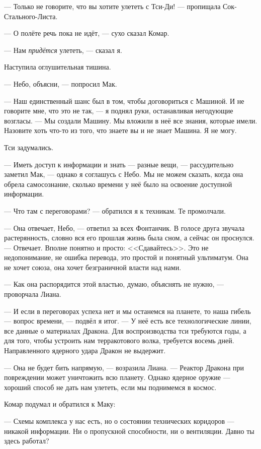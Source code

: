 --- Только не говорите, что вы хотите улететь с Тси-Ди! --- пропищала Сок-Стального-Листа.

--- О полёте речь пока не идёт, --- сухо сказал Комар.

--- Нам \emph{придётся} улететь, --- сказал я.

Наступила оглушительная тишина.

--- Небо, объясни, --- попросил Мак.

--- Наш единственный шанс был в том, чтобы договориться с Машиной.
И не говорите мне, что это не так, --- я поднял руки, останавливая негодующие возгласы.
--- Мы создали Машину.
Мы вложили в неё все знания, которые имели.
Назовите хоть что-то из того, что знаете вы и не знает Машина.
Я не могу.

Тси задумались.

--- Иметь доступ к информации и знать --- разные вещи, --- рассудительно заметил Мак, --- однако я соглашусь с Небо.
Мы не можем сказать, когда она обрела самосознание, сколько времени у неё было на освоение доступной информации.

--- Что там с переговорами? --- обратился я к техникам.
Те промолчали.

--- Она отвечает, Небо, --- ответил за всех Фонтанчик.
В голосе друга звучала растерянность, словно вся его прошлая жизнь была сном, а сейчас он проснулся.
--- Отвечает.
Вполне понятно и просто: <<Сдавайтесь>>.
Это не недопонимание, не ошибка перевода, это простой и понятный ультиматум.
Она не хочет союза, она хочет безграничной власти над нами.

--- Как она распорядится этой властью, думаю, объяснять не нужно, --- проворчала Лиана.

--- И если в переговорах успеха нет и мы останемся на планете, то наша гибель --- вопрос времени, --- подвёл я итог.
--- У неё есть все технологические линии, все данные о материалах Дракона.
Для воспроизводства тси требуются годы, а для того, чтобы устроить нам терракотового волка, требуется восемь дней.
Направленного ядерного удара Дракон не выдержит.

--- Она не будет бить напрямую, --- возразила Лиана.
--- Реактор Дракона при повреждении может уничтожить всю планету.
Однако ядерное оружие --- хороший способ не дать нам улететь, если мы поднимемся в космос.

Комар подумал и обратился к Маку:

--- Схемы комплекса у нас есть, но о состоянии технических коридоров --- никакой информации.
Ни о пропускной способности, ни о вентиляции.
Давно ты здесь работал?

